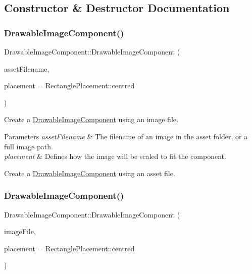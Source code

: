 \subsection{Constructor \& Destructor Documentation}
\mbox{\label{classDrawableImageComponent_a9147901da528e956ccabb6d77128ff94}} 
\subsubsection{\texorpdfstring{Drawable\+Image\+Component()}{DrawableImageComponent()}\hspace{0.1cm}{\footnotesize\ttfamily [1/5]}}
{\footnotesize\ttfamily Drawable\+Image\+Component\+::\+Drawable\+Image\+Component (\begin{DoxyParamCaption}\item[{String}]{asset\+Filename,  }\item[{Rectangle\+Placement}]{placement = {\ttfamily RectanglePlacement\+:\+:centred} }\end{DoxyParamCaption})}

Create a \mbox{\hyperlink{classDrawableImageComponent}{Drawable\+Image\+Component}} using an image file.


\begin{DoxyParams}{Parameters}
{\em asset\+Filename} & The filename of an image in the asset folder, or a full image path.\\
\hline
{\em placement} & Defines how the image will be scaled to fit the component.\\
\hline
\end{DoxyParams}
Create a \mbox{\hyperlink{classDrawableImageComponent}{Drawable\+Image\+Component}} using an asset file. \mbox{\label{classDrawableImageComponent_ad1e3b464eb032dfefe350ea3c70b8f0e}} 
\subsubsection{\texorpdfstring{Drawable\+Image\+Component()}{DrawableImageComponent()}\hspace{0.1cm}{\footnotesize\ttfamily [2/5]}}
{\footnotesize\ttfamily Drawable\+Image\+Component\+::\+Drawable\+Image\+Component (\begin{DoxyParamCaption}\item[{File}]{image\+File,  }\item[{Rectangle\+Placement}]{placement = {\ttfamily RectanglePlacement\+:\+:centred} }\end{DoxyParamCaption})}

